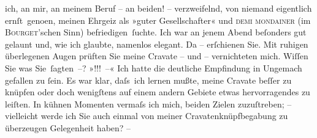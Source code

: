                ich, an mir, an meinem Beruf – an beiden! – verzweifelnd, von niemand eigentlich
                  ernſt geno{\geminationm}en, meinen Ehrgeiz als »guter
               Gesellschafter« und \textsc{demi mondainer}{ }\introOben{}(im \textsc{Bourget}’schen Sinn)\introOben{} befriedigen ſuchte.
               Ich war an jenem Abend beſonders gut gelaunt und, wie ich glaubte, namenlos elegant.
               Da – erſchienen Sie. Mit ruhigen überlegenen Augen prüften Sie meine Cravate – {\pb}und – vernichteten mich. Wiſſen Sie was Sie ſagten –?
                  »\label{K_L03901-6v}\label{K_L03901-6}!!! –« Ich hatte die deutliche Empfindung in Ungemach
               gefallen zu{ }ſein. Es war klar, daſs ich lernen mußte, meine Cravate beſſer zu knüpfen
               oder doch wenigſtens auf einem andern Gebiete etwas hervorragendes zu leiſten. In
               kühnen Momenten vermaſs ich mich, beiden Zielen zuzuſtreben; – {\pb}vielleicht werde ich Sie auch einmal von meiner
               Cravatenknüpfbegabung zu überzeugen Gelegenheit haben? –\pend
           
